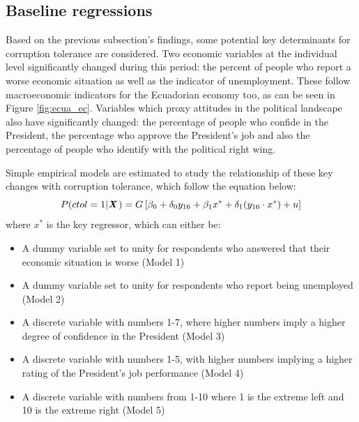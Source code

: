 \documentclass[12pt,a4]{article}\usepackage[]{graphicx}\usepackage[]{xcolor}
\begin{document}



\subsection{Baseline regressions}
\label{subsec:fin2}

Based on the previous subsection's findings, some potential key determinants for corruption tolerance are considered. Two economic variables at the individual level significantly changed during this period: the percent of people who report a worse economic situation as well as the indicator of unemployment. These follow macroeconomic indicators for the Ecuadorian economy too, as can be seen in Figure \ref{fig:ecua_ec}. Variables which proxy attitudes in the political landscape also have significantly changed: the percentage of people who confide in the President, the percentage who approve the President's job and also the percentage of people who identify with the political right wing.

Simple empirical models are estimated to study the relationship of these key changes with corruption tolerance, which follow the equation below:
\begin{equation}
\label{eqn:simplemod}
P(ctol = 1 | \textbf{\textit{X}} \hspace{0.04cm}) = G \left[ \beta_0 + \delta_0 y_{16} + \beta_1 x^* + \delta_1 (y_{16} \cdot x^*) + u\right]
\end{equation}
where $x^*$ is the key regressor, which can either be: 
\begin{itemize}
  \item A dummy variable set to unity for respondents who answered that their economic situation is worse (Model 1)
  \item A dummy variable set to unity for respondents who report being unemployed (Model 2)
  \item A discrete variable with numbers 1-7, where higher numbers imply a higher degree of confidence in the President (Model 3)
  \item A discrete variable with numbers 1-5, with higher numbers implying a higher rating of the President's job performance (Model 4)
  \item A discrete variable with numbers from 1-10 where 1 is the extreme left and 10 is the extreme right (Model 5)
\end{itemize}
\end{document}
